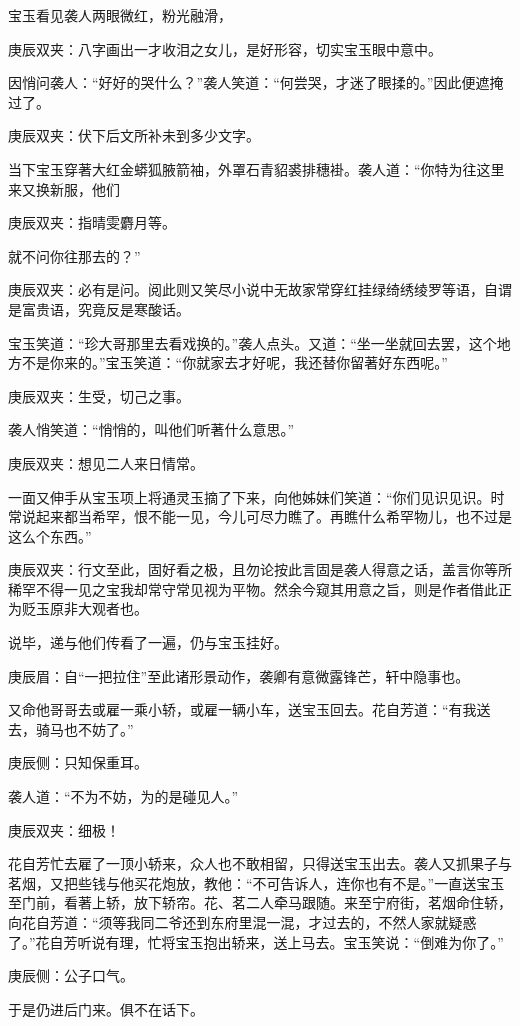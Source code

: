 \begin{parag}
    宝玉看见袭人两眼微红，粉光融滑，\begin{note}庚辰双夹：八字画出一才收泪之女儿，是好形容，切实宝玉眼中意中。\end{note}因悄问袭人：“好好的哭什么？”袭人笑道：“何尝哭，才迷了眼揉的。”因此便遮掩过了。\begin{note}庚辰双夹：伏下后文所补未到多少文字。\end{note}当下宝玉穿著大红金蟒狐腋箭袖，外罩石青貂裘排穗褂。袭人道：“你特为往这里来又换新服，他们\begin{note}庚辰双夹：指晴雯麝月等。\end{note}就不问你往那去的？”\begin{note}庚辰双夹：必有是问。阅此则又笑尽小说中无故家常穿红挂绿绮绣绫罗等语，自谓是富贵语，究竟反是寒酸话。\end{note}宝玉笑道：“珍大哥那里去看戏换的。”袭人点头。又道：“坐一坐就回去罢，这个地方不是你来的。”宝玉笑道：“你就家去才好呢，我还替你留著好东西呢。”\begin{note}庚辰双夹：生受，切己之事。\end{note}袭人悄笑道：“悄悄的，叫他们听著什么意思。”\begin{note}庚辰双夹：想见二人来日情常。\end{note}一面又伸手从宝玉项上将通灵玉摘了下来，向他姊妹们笑道：“你们见识见识。时常说起来都当希罕，恨不能一见，今儿可尽力瞧了。再瞧什么希罕物儿，也不过是这么个东西。”\begin{note}庚辰双夹：行文至此，固好看之极，且勿论按此言固是袭人得意之话，盖言你等所稀罕不得一见之宝我却常守常见视为平物。然余今窥其用意之旨，则是作者借此正为贬玉原非大观者也。\end{note}说毕，递与他们传看了一遍，仍与宝玉挂好。\begin{note}庚辰眉：自“一把拉住”至此诸形景动作，袭卿有意微露锋芒，轩中隐事也。\end{note}又命他哥哥去或雇一乘小轿，或雇一辆小车，送宝玉回去。花自芳道：“有我送去，骑马也不妨了。”\begin{note}庚辰侧：只知保重耳。\end{note}袭人道：“不为不妨，为的是碰见人。”\begin{note}庚辰双夹：细极！\end{note}
\end{parag}


\begin{parag}
    花自芳忙去雇了一顶小轿来，众人也不敢相留，只得送宝玉出去。袭人又抓果子与茗烟，又把些钱与他买花炮放，教他：“不可告诉人，连你也有不是。”一直送宝玉至门前，看著上轿，放下轿帘。花、茗二人牵马跟随。来至宁府街，茗烟命住轿，向花自芳道：“须等我同二爷还到东府里混一混，才过去的，不然人家就疑惑了。”花自芳听说有理，忙将宝玉抱出轿来，送上马去。宝玉笑说：“倒难为你了。”\begin{note}庚辰侧：公子口气。\end{note}于是仍进后门来。俱不在话下。
\end{parag}


